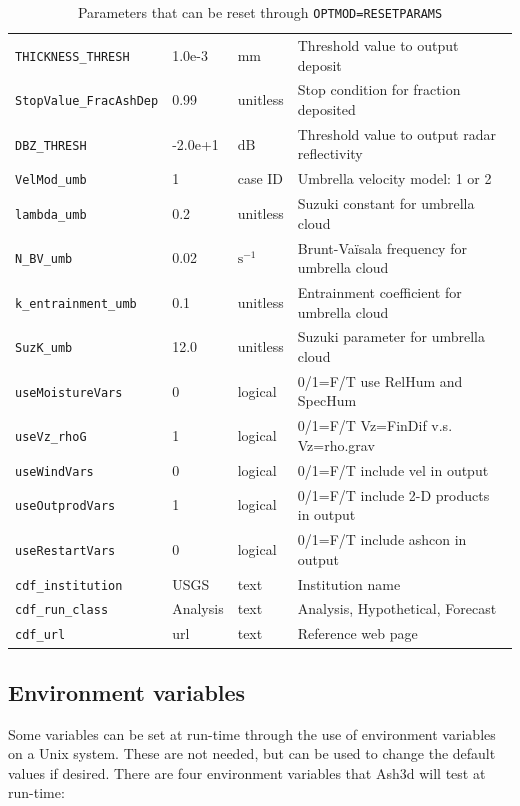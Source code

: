 \begin{table}[htbp]
\begin{center}
\begin{tabular}{| l | l | l | l |}
\texttt{THICKNESS\_THRESH} & 1.0e-3   & $\mathrm{mm}$      &  Threshold value to output deposit \\
\texttt{StopValue\_FracAshDep} & 0.99 & unitless           &  Stop condition for fraction deposited \\
\texttt{DBZ\_THRESH}       & -2.0e+1  & $\mathrm{dB}$      &  Threshold value to output radar reflectivity \\
\texttt{VelMod\_umb}       & 1        & case ID            &  Umbrella velocity model: 1 \cite{Costa14} or 2 \cite{Webster20} \\
\texttt{lambda\_umb}       & 0.2      & unitless           &  Suzuki constant for umbrella cloud \\
\texttt{N\_BV\_umb}        & 0.02     & $\mathrm{s^{-1}}$  &  Brunt-Va\"isala frequency for umbrella cloud \\
\texttt{k\_entrainment\_umb} & 0.1    & unitless           &  Entrainment coefficient for umbrella cloud \\
\texttt{SuzK\_umb}         & 12.0     & unitless           &  Suzuki parameter for umbrella cloud \\
\texttt{useMoistureVars}   & 0        & logical            &  0/1=F/T use RelHum and SpecHum \\
\texttt{useVz\_rhoG}       & 1        & logical            &  0/1=F/T Vz=FinDif v.s. Vz=rho.grav \\
\texttt{useWindVars}       & 0        & logical            &  0/1=F/T include vel in output \\
\texttt{useOutprodVars}    & 1        & logical            &  0/1=F/T include 2-D products in output \\
\texttt{useRestartVars}    & 0        & logical            &  0/1=F/T include ashcon in output \\
\texttt{cdf\_institution}  & USGS     & text               &  Institution name \\
\texttt{cdf\_run\_class}   & Analysis & text               &  Analysis, Hypothetical, Forecast \\
\texttt{cdf\_url}          & url      & text               &  Reference web page \\
\hline
\end{tabular}
\caption{\label{tab:ResetParam}Parameters that can be reset through \texttt{OPTMOD=RESETPARAMS}}
\end{center}
\end{table}
\normalsize

\subsection{Environment variables}
Some variables can be set at run-time through the use of environment variables on a Unix
system. These are not needed, but can be used to change the default values if desired.
There are four environment variables that Ash3d will test at run-time:


